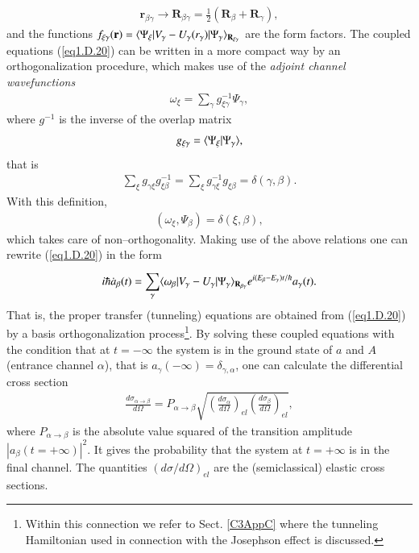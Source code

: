 \begin{subappendices}
\begin{align}\label{eq1.D.21}
\mathbf r_{\beta\gamma}\rightarrow\mathbf R_{\beta\gamma}=\frac{1}{2}(\mathbf R_\beta+\mathbf R_\gamma),
\end{align}
and the functions $f_{\xi\gamma}(\mathbf r)=\langle {\Psi_\xi|V_\gamma-U_\gamma(r_\gamma)|\Psi_\gamma} \rangle_{\mathbf R_{\xi\gamma}}$
 are the form factors. The coupled equations (\ref{eq1.D.20}) can be written in a more compact way by an orthogonalization procedure, which makes use of the \textit{adjoint channel wavefunctions}
\begin{align}\label{eq1.D.22}
\omega_\xi=\sum_{\gamma}g^{-1}_{\xi\gamma}\Psi_\gamma,
\end{align}
where $g^{-1}$ is the inverse of the overlap matrix
\begin{align}\label{eq1.D.23}
g_{\xi\gamma}=\langle {\Psi_\xi|\Psi_\gamma} \rangle,
\end{align}
that is
\begin{align}\label{eq1.D.24}
\sum_{\xi}g_{\gamma\xi}g^{-1}_{\xi\beta}=\sum_{\xi}^{}g^{-1}_{\gamma\xi}g_{\xi\beta}=\delta(\gamma,\beta).
\end{align}
With this definition,
\begin{align}\label{eq1.D.25}
(\omega_\xi,\Psi_\beta)=\delta(\xi,\beta),
\end{align}
which takes care of non--orthogonality. Making use of the above relations one can rewrite (\ref{eq1.D.20}) in the form
\begin{align}\label{eq1.D.26}
i\hbar \dot a_\beta(t)=\sum_{\gamma}^{}\langle {\omega_\beta|V_\gamma-U_\gamma|\Psi_\gamma} \rangle_{\mathbf R_{\beta\gamma}}e^{i(E_\beta-E_\gamma)t/\hbar}a_\gamma(t).
\end{align}
That is, the proper transfer (tunneling) equations are obtained from (\ref{eq1.D.20}) by a basis orthogonalization process\footnote{Within this connection we refer to Sect. \ref{C3AppC} where the tunneling Hamiltonian used in connection with the Josephson effect is discussed.}. 
 By solving these coupled equations with the condition that at $t=-\infty$ the system is in the ground state of $a$ and $A$ (entrance channel $\alpha$), that is $a_\gamma(-\infty)=\delta_{\gamma,\alpha}$, one can calculate the differential cross section
 \begin{align}\label{eq1.D.27}
 \frac{d\sigma_{\alpha\rightarrow\beta}}{d\Omega}=P_{\alpha\rightarrow\beta}\sqrt{\left(\frac{d\sigma_\alpha}{d\Omega}\right)_{el}\left(\frac{d\sigma_\beta}{d\Omega}\right)_{el}},
 \end{align}
 where $P_{\alpha\rightarrow\beta}$ is the absolute value squared of the transition amplitude $|a_{\beta}(t=+\infty)|^2$. It gives the probability that the system at $t=+\infty$ is in the final channel. The quantities $(d\sigma/d\Omega)_{el}$ are the (semiclassical) elastic cross sections. 
 

\end{subappendices}
